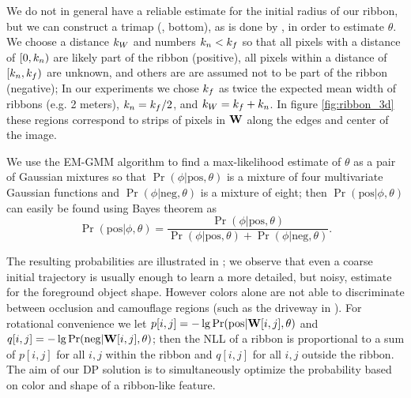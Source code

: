 We do not in general have a reliable estimate for the initial radius of our ribbon, but we can construct a trimap (, bottom), as is done by \GrabCut{}, in order to estimate $\theta$. 
We choose a distance $k_W$ and numbers $k_n < k_f$ so that all pixels with a distance of $[0, k_n)$ are likely part of the ribbon (positive), all pixels within a distance of $[k_n, k_f)$ are unknown, and others are are assumed not to be part of the ribbon (negative);
In our experiments we chose  $k_f$ as twice the expected mean width of ribbons (e.g. 2 meters), $k_n = k_f/2$, and $k_W=k_f+k_n$.  
In figure \ref{fig:ribbon_3d} these regions correspond to strips of pixels in $\mathbf{W}{}$ along the edges and center of the image.


We use the EM-GMM algorithm to find a max-likelihood estimate of $\theta$ as a pair of Gaussian mixtures so that $\Pr(\phi|\text{pos}, \theta)$ is a mixture of four multivariate Gaussian functions and $\Pr(\phi|\text{neg}, \theta)$ is a mixture of eight; then $\Pr(\text{pos}|\phi, \theta)$ can easily be found using Bayes theorem as 
$$\Pr(\text{pos}|\phi, \theta)= \frac{\Pr(\phi|\text{pos}, \theta)}{\Pr(\phi|\text{pos}, \theta)+\Pr(\phi|\text{neg}, \theta)}.$$




The resulting probabilities are illustrated in ; we observe that even a coarse initial trajectory is usually enough to learn a more detailed, but noisy, estimate for the foreground object shape.
However colors alone are not able to discriminate between occlusion and camouflage regions (such as the driveway in ). 
For rotational convenience we let $p[i,j]=-\lg \Pr(\text{pos}|\mathbf{W}{}[i,j], \theta)$ and $q[i,j]=-\lg \Pr(\text{neg}|\mathbf{W}{}[i,j], \theta)$; then the \ac{NLL} of a ribbon is proportional to a sum of $p[i,j]$ for all $i,j$ within the ribbon and $q[i,j]$ for all $i,j$ outside the ribbon. 
The aim of our \ac{DP} solution is to simultaneously optimize the probability based on color and shape of a ribbon-like feature. 



